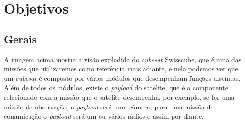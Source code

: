 
\section{Objetivos}
\subsection*{Gerais}\label{gerais}

\noindent
\begin{minipage}{\linewidth}
\label{swisscube_exploded_fig}
\end{minipage}

A imagem acima mostra a visão explodida do \textit{cubesat} Swisscube, que é uma das missões que utilizaremos como referência mais adiante, e nela podemos ver que um \textit{cubesat} é composto por vários módulos que desempenham funções distintas. Além de todos os módulos, existe o \textit{payload} do satélite, que é o componente relacionado com a missão que o satélite desempenha, por exemplo, se for uma missão de observação, o \textit{payload} será uma câmera, para uma missão de comunicação o \textit{payload} será um ou vários rádios e assim por diante. 

